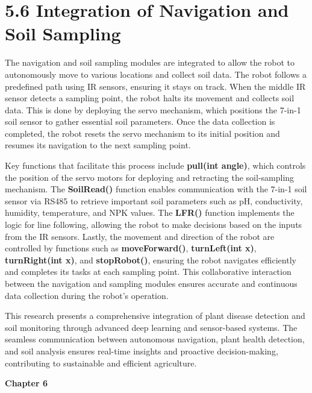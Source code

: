 \documentclass{book} %
\begin{document}
\noindent 
\section{5.6 Integration of Navigation and Soil Sampling}

\noindent The navigation and soil sampling modules are integrated to allow the robot to autonomously move to various locations and collect soil data. The robot follows a predefined path using IR sensors, ensuring it stays on track. When the middle IR sensor detects a sampling point, the robot halts its movement and collects soil data. This is done by deploying the servo mechanism, which positions the 7-in-1 soil sensor to gather essential soil parameters. Once the data collection is completed, the robot resets the servo mechanism to its initial position and resumes its navigation to the next sampling point.

\noindent Key functions that facilitate this process include \textbf{pull(int angle)}, which controls the position of the servo motors for deploying and retracting the soil-sampling mechanism. The \textbf{SoilRead()} function enables communication with the 7-in-1 soil sensor via RS485 to retrieve important soil parameters such as pH, conductivity, humidity, temperature, and NPK values. The \textbf{LFR()} function implements the logic for line following, allowing the robot to make decisions based on the inputs from the IR sensors. Lastly, the movement and direction of the robot are controlled by functions such as \textbf{moveForward()}, \textbf{turnLeft(int x)}, \textbf{turnRight(int x)}, and \textbf{stopRobot()}, ensuring the robot navigates efficiently and completes its tasks at each sampling point. This collaborative interaction between the navigation and sampling modules ensures accurate and continuous data collection during the robot's operation.

\noindent 

\noindent This research presents a comprehensive integration of plant disease detection and soil monitoring through advanced deep learning and sensor-based systems. The seamless communication between autonomous navigation, plant health detection, and soil analysis ensures real-time insights and proactive decision-making, contributing to sustainable and efficient agriculture.

\noindent \textbf{}

\noindent \eject \textbf{}

\noindent \textbf{Chapter 6}
\end{document}
